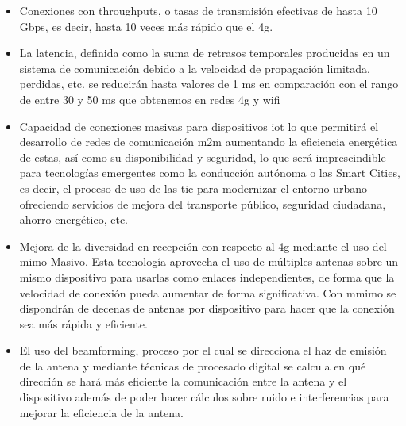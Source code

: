 \begin{itemize}
\item Conexiones con throughputs, o tasas de transmisión efectivas de hasta 10 Gbps, es decir, hasta 10 veces más rápido que el \gls{4g}.
\item La latencia, definida como la suma de retrasos temporales producidas en un sistema de comunicación debido a la velocidad de propagación limitada, perdidas, etc. se reducirán hasta valores de 1 ms en comparación con el rango de entre 30 y 50 ms que obtenemos en redes \gls{4g} y \gls{wifi}
\item Capacidad de conexiones masivas para dispositivos \gls{iot} lo que permitirá  el desarrollo de redes de comunicación \gls{m2m} aumentando la eficiencia energética de estas, así como su disponibilidad y seguridad, lo que será imprescindible para tecnologías emergentes como la conducción autónoma o las Smart Cities, es decir, el proceso de uso de las \gls{tic} para modernizar el entorno urbano ofreciendo servicios de mejora del transporte público, seguridad ciudadana, ahorro energético, etc.
\item Mejora de la diversidad en recepción con respecto al \gls{4g} mediante el uso del \gls{mimo} Masivo. Esta tecnología aprovecha el uso de múltiples antenas sobre un mismo dispositivo para usarlas como enlaces independientes, de forma que la velocidad de conexión pueda aumentar de forma significativa. Con \gls{mmimo} se dispondrán de decenas de antenas por dispositivo para hacer que la conexión sea más rápida y eficiente.
\item El uso del beamforming, proceso por el cual se direcciona el haz de emisión de la antena y mediante técnicas de procesado digital se calcula en qué dirección se hará más eficiente la comunicación entre la antena y el dispositivo además de poder hacer cálculos sobre ruido e interferencias para mejorar la eficiencia de la antena.
\end{itemize}

